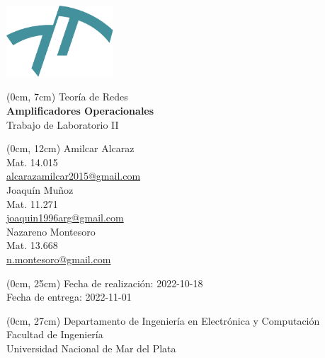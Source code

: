 \newcommand{\materia}[1]{{\huge #1}\\\vspace{0.5cm}}
\newcommand{\titulo}[1]{{\Huge \textbf{#1}}\\\vspace{0.5cm}}
\newcommand{\subtitulo}[1]{{\huge #1}\\\vspace{0.5cm}}
\newcommand{\autor}[3]{#1\\{\small Mat. #2\\\href{mailto:#3}{#3}}\\\vspace{0.7cm}}
\newcommand{\fecha}[4]{{\small Fecha de #1: #4-#3-#2}\\} %
\newcommand{\departamento}[1]{{\small Departamento de #1\\Facultad de Ingeniería\\Universidad Nacional de Mar del Plata}}
\newenvironment{mytitlepage}
    {\pagenumbering{gobble}\begin{center}}
    {\end{center}\newpage\pagenumbering{arabic}}

\begin{mytitlepage}
    \includegraphics[width=4cm]{img/logo-fi.pdf}
   
    \begin{textblock*}{\paperwidth}(0cm, 7cm)
    \materia{Teoría de Redes}
    \titulo{Amplificadores Operacionales}
    \subtitulo{Trabajo de Laboratorio II}
    \end{textblock*}
    
    \begin{textblock*}{\paperwidth}(0cm, 12cm)
    \autor{Amilcar Alcaraz}{14.015}{alcarazamilcar2015@gmail.com}
    \autor{Joaquín Muñoz}{11.271}{joaquin1996arg@gmail.com}
    \autor{Nazareno Montesoro}{13.668}{n.montesoro@gmail.com}
    \end{textblock*}
    
    \begin{textblock*}{\paperwidth}(0cm, 25cm) 
    \fecha{realización}{18}{10}{2022}
    \fecha{entrega}{01}{11}{2022}
    \end{textblock*}
    
    \begin{textblock*}{\paperwidth}(0cm, 27cm) 
    \departamento{Ingeniería en Electrónica y Computación}
    \end{textblock*}
\end{mytitlepage}
